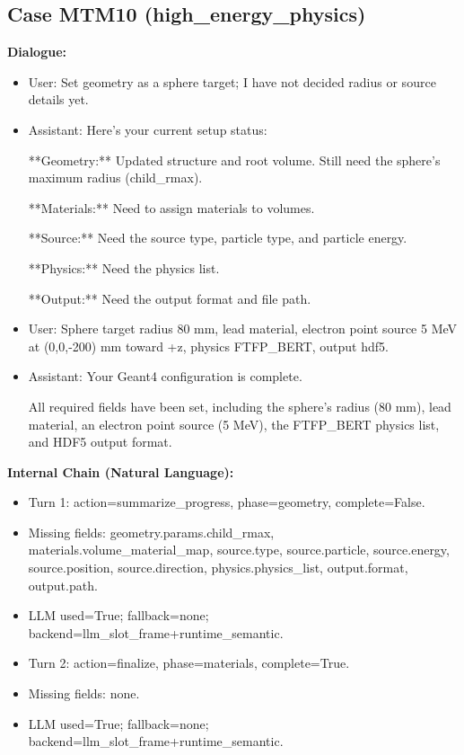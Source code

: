 \documentclass[11pt]{ctexart}
\begin{document}
\subsection{Case MTM10 (high\_energy\_physics)}
\textbf{Dialogue:}
\begin{itemize}
\item User: Set geometry as a sphere target; I have not decided radius or source details yet.
\item Assistant: Here's your current setup status:

**Geometry:** Updated structure and root volume. Still need the sphere's maximum radius (child\_rmax).

**Materials:** Need to assign materials to volumes.

**Source:** Need the source type, particle type, and particle energy.

**Physics:** Need the physics list.

**Output:** Need the output format and file path.
\item User: Sphere target radius 80 mm, lead material, electron point source 5 MeV at (0,0,-200) mm toward +z, physics FTFP\_BERT, output hdf5.
\item Assistant: Your Geant4 configuration is complete.

All required fields have been set, including the sphere's radius (80 mm), lead material, an electron point source (5 MeV), the FTFP\_BERT physics list, and HDF5 output format.
\end{itemize}
\textbf{Internal Chain (Natural Language):}
\begin{itemize}
\item Turn 1: action=summarize\_progress, phase=geometry, complete=False.
\item Missing fields: geometry.params.child\_rmax, materials.volume\_material\_map, source.type, source.particle, source.energy, source.position, source.direction, physics.physics\_list, output.format, output.path.
\item LLM used=True; fallback=none; backend=llm\_slot\_frame+runtime\_semantic.
\item Turn 2: action=finalize, phase=materials, complete=True.
\item Missing fields: none.
\item LLM used=True; fallback=none; backend=llm\_slot\_frame+runtime\_semantic.
\end{itemize}
\end{document}
